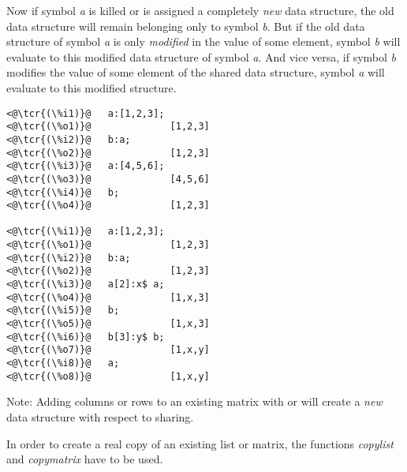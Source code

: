 \documentclass[../Maxima_Workbook.tex]{subfiles}
\begin{document}
\lz Now if symbol \emph{a} is killed or is assigned a completely \emph{new} data structure, the old data structure will remain belonging only to symbol \emph{b}. But if the old data structure of symbol \emph{a} is only \emph{modified} in the value of some element, symbol \emph{b} will evaluate to this modified data structure of symbol \emph{a}. And vice versa, if symbol \emph{b} modifies the value of some element of the shared data structure, symbol \emph{a} will evaluate to this modified structure.

\begin{lstlisting}
<@\tcr{(\%i1)}@   a:[1,2,3];
<@\tcr{(\%o1)}@			     [1,2,3]
<@\tcr{(\%i2)}@   b:a;
<@\tcr{(\%o2)}@			     [1,2,3]
<@\tcr{(\%i3)}@   a:[4,5,6];
<@\tcr{(\%o3)}@			     [4,5,6]
<@\tcr{(\%i4)}@   b;
<@\tcr{(\%o4)}@			     [1,2,3]

<@\tcr{(\%i1)}@   a:[1,2,3];
<@\tcr{(\%o1)}@			     [1,2,3]
<@\tcr{(\%i2)}@   b:a;
<@\tcr{(\%o2)}@			     [1,2,3]
<@\tcr{(\%i3)}@   a[2]:x$ a;
<@\tcr{(\%o4)}@			     [1,x,3]
<@\tcr{(\%i5)}@   b;
<@\tcr{(\%o5)}@			     [1,x,3]
<@\tcr{(\%i6)}@   b[3]:y$ b;
<@\tcr{(\%o7)}@			     [1,x,y]
<@\tcr{(\%i8)}@   a;
<@\tcr{(\%o8)}@			     [1,x,y]
\end{lstlisting}

\lz Note: Adding columns or rows to an existing matrix with  or  will create a \emph{new} data structure with respect to sharing.

\lz In order to create a real copy of an existing list or matrix, the functions \emph{copylist} and \emph{copymatrix} have to be used.
\end{document}
